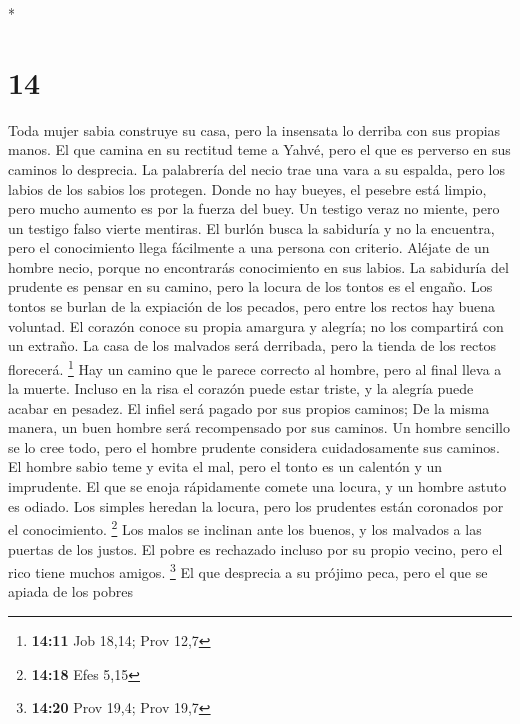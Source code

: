 \begin{paracol}{2}
\switchcolumn[0]*

\hypertarget{section-26}{%
\section{14}\label{section-26}}

 Toda mujer sabia construye su casa, pero la insensata lo
derriba con sus propias manos.  El que camina en su
rectitud teme a Yahvé, pero el que es perverso en sus caminos lo
desprecia.  La palabrería del necio trae una vara a su
espalda, pero los labios de los sabios los protegen. 
Donde no hay bueyes, el pesebre está limpio, pero mucho aumento es por
la fuerza del buey.  Un testigo veraz no miente, pero un
testigo falso vierte mentiras.  El burlón busca la
sabiduría y no la encuentra, pero el conocimiento llega fácilmente a una
persona con criterio.  Aléjate de un hombre necio, porque
no encontrarás conocimiento en sus labios.  La sabiduría
del prudente es pensar en su camino, pero la locura de los tontos es el
engaño.  Los tontos se burlan de la expiación de los
pecados, pero entre los rectos hay buena voluntad.  El
corazón conoce su propia amargura y alegría; no los compartirá con un
extraño.  La casa de los malvados será derribada, pero la
tienda de los rectos florecerá. \footnote{\textbf{14:11} Job 18,14; Prov
  12,7}  Hay un camino que le parece correcto al hombre,
pero al final lleva a la muerte.  Incluso en la risa el
corazón puede estar triste, y la alegría puede acabar en pesadez.
 El infiel será pagado por sus propios caminos; De la
misma manera, un buen hombre será recompensado por sus caminos.
 Un hombre sencillo se lo cree todo, pero el hombre
prudente considera cuidadosamente sus caminos.  El hombre
sabio teme y evita el mal, pero el tonto es un calentón y un imprudente.
 El que se enoja rápidamente comete una locura, y un
hombre astuto es odiado.  Los simples heredan la locura,
pero los prudentes están coronados por el conocimiento. \footnote{\textbf{14:18}
  Efes 5,15}  Los malos se inclinan ante los buenos, y
los malvados a las puertas de los justos.  El pobre es
rechazado incluso por su propio vecino, pero el rico tiene muchos
amigos. \footnote{\textbf{14:20} Prov 19,4; Prov 19,7} 
El que desprecia a su prójimo peca, pero el que se apiada de los pobres

\end{paracol}
